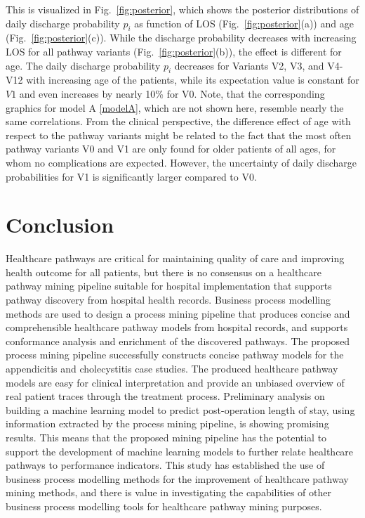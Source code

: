 \documentclass{elsarticle}
\begin{document}
This is visualized in Fig.~\ref{fig:posterior}, which shows the posterior distributions of daily discharge probability $p_i$ as function of LOS (Fig.~\ref{fig:posterior}(a)) and age (Fig.~\ref{fig:posterior}(c)). While the discharge probability decreases with increasing LOS for all pathway variants (Fig.~\ref{fig:posterior}(b)), the effect is different for age. 
The daily discharge probability $p_i$ decreases for Variants V2, V3, and V4-V12 with increasing age of the patients, while its expectation value is constant for $V1$ and even increases by nearly 10\% for V0. Note, that the corresponding graphics for model A \eqref{modelA}, which are not shown here, resemble nearly the same correlations. 
From the clinical perspective, the difference effect of age with respect to the pathway variants might be related to the fact that the most often pathway variants V0 and V1 are only found for older patients of all ages, for whom no complications are expected. 
However, the uncertainty of daily discharge probabilities for V1 is significantly larger compared to V0.

%

\section{Conclusion}
Healthcare pathways are critical for maintaining quality of care and improving health outcome for all patients, but there is no consensus on a healthcare pathway mining pipeline suitable for hospital implementation that supports pathway discovery from hospital health records. Business process modelling methods are used to design a process mining pipeline that produces concise and comprehensible healthcare pathway models from hospital records, and supports conformance analysis and enrichment of the discovered pathways. The proposed process mining pipeline successfully constructs concise pathway models for the appendicitis and cholecystitis case studies. The produced healthcare pathway models are easy for clinical interpretation and provide an unbiased overview of real patient traces through the treatment process. Preliminary analysis on building a machine learning model to predict post-operation length of stay, using information extracted by the process mining pipeline, is showing promising results. This means that the proposed mining pipeline has the potential to support the development of machine learning models to further relate healthcare pathways to performance indicators. This study has established the use of business process modelling methods for the improvement of healthcare pathway mining methods, and there is value in investigating the capabilities of other business process modelling tools for healthcare pathway mining purposes.
\end{document}
